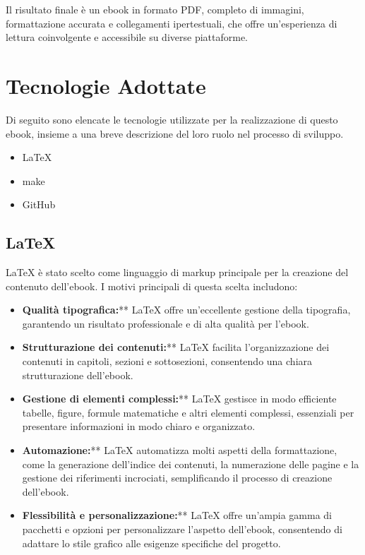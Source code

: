 \documentclass[a4paper,12pt]{report}
\begin{document}
Il risultato finale è un ebook in formato PDF, completo di immagini, formattazione accurata e collegamenti ipertestuali, che offre un'esperienza di lettura coinvolgente e accessibile su diverse piattaforme.

\section{Tecnologie Adottate}

Di seguito sono elencate le tecnologie utilizzate per la realizzazione di questo ebook, insieme a una breve descrizione del loro ruolo nel processo di sviluppo.

\begin{itemize}
	\item LaTeX
	\item make
	\item GitHub
\end{itemize}

\subsection{LaTeX}

LaTeX è stato scelto come linguaggio di markup principale per la creazione del contenuto dell'ebook. I motivi principali di questa scelta includono:

\begin{itemize}
	\item \textbf{Qualità tipografica:}** LaTeX offre un'eccellente gestione della tipografia, garantendo un risultato professionale e di alta qualità per l'ebook.
	\item \textbf{Strutturazione dei contenuti:}** LaTeX facilita l'organizzazione dei contenuti in capitoli, sezioni e sottosezioni, consentendo una chiara strutturazione dell'ebook.
	\item \textbf{Gestione di elementi complessi:}** LaTeX gestisce in modo efficiente tabelle, figure, formule matematiche e altri elementi complessi, essenziali per presentare informazioni in modo chiaro e organizzato.
	\item \textbf{Automazione:}** LaTeX automatizza molti aspetti della formattazione, come la generazione dell'indice dei contenuti, la numerazione delle pagine e la gestione dei riferimenti incrociati, semplificando il processo di creazione dell'ebook.
	\item \textbf{Flessibilità e personalizzazione:}** LaTeX offre un'ampia gamma di pacchetti e opzioni per personalizzare l'aspetto dell'ebook, consentendo di adattare lo stile grafico alle esigenze specifiche del progetto.
\end{itemize}
					
\end{document}
